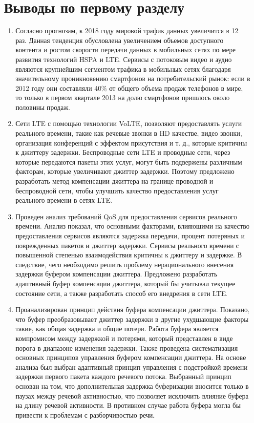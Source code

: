 \section{Выводы по первому разделу } \label{sect1_conclus}

\begin{enumerate}
\item Согласно прогнозам, к 2018 году мировой трафик данных увеличится в 12 раз. Данная тенденция обусловлена увеличением объемов доступного контента и ростом скорости передачи данных в мобильных сетях по мере развития технологий HSPA и LTE.
Сервисы с потоковым видео и аудио являются крупнейшим сегментом трафика в мобильных сетях благодаря значительному проникновению смартфонов на потребительский рынок:
если в 2012 году они составляли 40\% от общего объема продаж телефонов в мире, то только в первом квартале 2013 на долю смартфонов пришлось около половины продаж.
\item Сети LTE с помощью технологии VoLTE, позволяют предоставлять услуги реального времени, 
такие как речевые звонки в HD качестве, видео звонки, организация конференций с эффектом присутствия и т. д., которые критичны к джиттеру задержки. 
Беспроводные сети LTE и проводные сети, через которые передаются пакеты этих услуг, могут быть подвержены различным факторам, которые увеличивают джиттер задержки. 
Поэтому предложено разработать метод компенсации джиттера на границе проводной и беспроводной сети, чтобы улучшить качество предоставления услуг реального времени в сетях LTE.

\item Проведен анализ требований QoS для предоставления сервисов реального времени.
Анализ показал, что основными факторами, влияющими на качество предоставления сервисов являются задержка передачи, процент потеряных и поврежденных пакетов и джиттер задержки.
Сервисы реального времени с повышенной степенью взаимодействия критичны к джиттеру и задержке. В следствие, чего необходимо решить проблему нерационального внесения задержки буфером компенсации джиттера. 
Предложено разработать адаптивный буфер компенсации джиттера, который бы учитывал текущее состояние сети, а также разработать способ его внедрения  в сети LTE.
\item Проанализирован принцип действия буфера компенсации джиттера. 
Показано, что буфер преобразовывает джиттер задержки в другие ухудшающие факторы такие, как общая задержка и общие потери. 
Работа буфера является компромисом между задержкой и потерями, который представлен в виде порога в диапазоне изменения задержки.
Также проведена систематизация основных принципов управления буфером компенсации джиттера. 
На основе анализа был выбран адаптивный принцип управления с подстройкой времени задержки первого пакета каждого речевого потока. 
Выбранный принцип основан на том, что дополнительная задержка буферизации вносится только в паузах между речевой активностью, что позволяет исключить влияние буфера на длину речевой активности.
В противном случае работа буфера могла бы привести к проблемам с разборчивостью речи.


\end{enumerate}

\clearpage




